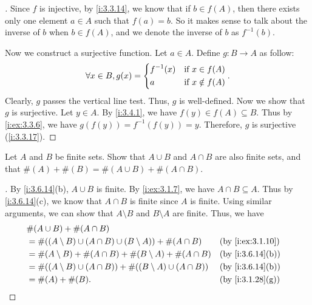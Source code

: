 \begin{proof}[]
  Since \(f\) is injective, by \cref{i:3.3.14}, we know that if \(b \in f(A)\), then there exists only one element \(a \in A\) such that \(f(a) = b\).
  So it makes sense to talk about the inverse of \(b\) when \(b \in f(A)\), and we denote the inverse of \(b\) as \(f^{-1}(b)\).

  Now we construct a surjective function.
  Let \(a \in A\).
  Define \(g : B \to A\) as follow:
  \[
    \forall x \in B, g(x) = \begin{dcases}
      f^{-1}(x) & \text{if } x \in f(A)    \\
      a         & \text{if } x \notin f(A)
    \end{dcases}.
  \]
  Clearly, \(g\) passes the vertical line test.
  Thus, \(g\) is well-defined.
  Now we show that \(g\) is surjective.
  Let \(y \in A\).
  By \cref{i:3.4.1}, we have \(f(y) \in f(A) \subseteq B\).
  Thus by \cref{i:ex:3.3.6}, we have \(g(f(y)) = f^{-1}(f(y)) = y\).
  Therefore, \(g\) is surjective (\cref{i:3.3.17}).
\end{proof}

\begin{ex}\label{i:ex:3.6.9}
  Let \(A\) and \(B\) be finite sets.
  Show that \(A \cup B\) and \(A \cap B\) are also finite sets, and that \(\#(A) + \#(B) = \#(A \cup B) + \#(A \cap B)\).
\end{ex}

\begin{proof}[]
  By \cref{i:3.6.14}(b), \(A \cup B\) is finite.
  By \cref{i:ex:3.1.7}, we have \(A \cap B \subseteq A\).
  Thus by \cref{i:3.6.14}(c), we know that \(A \cap B\) is finite since \(A\) is finite.
  Using similar arguments, we can show that \(A \setminus B\) and \(B \setminus A\) are finite.
  Thus, we have
  \begin{align*}
     & \#(A \cup B) + \#(A \cap B)                                                                       \\
     & = \#((A \setminus B) \cup (A \cap B) \cup (B \setminus A)) + \#(A \cap B)   &  & \by{i:ex:3.1.10} \\
     & = \#(A \setminus B) + \#(A \cap B) + \#(B \setminus A) + \#(A \cap B)       &  & \by{i:3.6.14}[b] \\
     & = \#((A \setminus B) \cup (A \cap B)) + \#((B \setminus A) \cup (A \cap B)) &  & \by{i:3.6.14}[b] \\
     & = \#(A) + \#(B).                                                            &  & \by{i:3.1.28}[g]
  \end{align*}
\end{proof}

